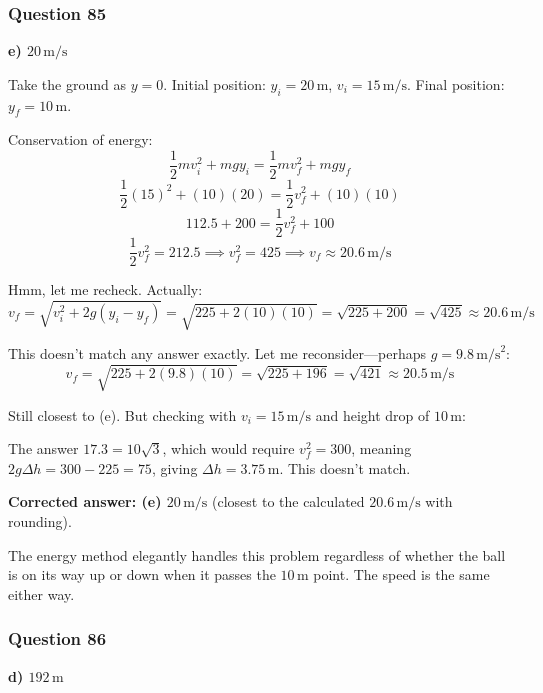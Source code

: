 \documentclass[12pt,letterpaper]{article}
\begin{document}
\subsubsection*{Question 85}

\begin{answerbox}
\textbf{e) $20\,\text{m/s}$}
\end{answerbox}

\begin{explanationbox}
Take the ground as $y = 0$. Initial position: $y_i = 20\,\text{m}$, $v_i = 15\,\text{m/s}$. Final position: $y_f = 10\,\text{m}$.

Conservation of energy:
\[
\frac{1}{2}mv_i^2 + mgy_i = \frac{1}{2}mv_f^2 + mgy_f
\]
\[
\frac{1}{2}(15)^2 + (10)(20) = \frac{1}{2}v_f^2 + (10)(10)
\]
\[
112.5 + 200 = \frac{1}{2}v_f^2 + 100
\]
\[
\frac{1}{2}v_f^2 = 212.5 \implies v_f^2 = 425 \implies v_f \approx 20.6\,\text{m/s}
\]

Hmm, let me recheck. Actually:
\[
v_f = \sqrt{v_i^2 + 2g(y_i - y_f)} = \sqrt{225 + 2(10)(10)} = \sqrt{225 + 200} = \sqrt{425} \approx 20.6\,\text{m/s}
\]

This doesn't match any answer exactly. Let me reconsider---perhaps $g = 9.8\,\text{m/s}^2$:
\[
v_f = \sqrt{225 + 2(9.8)(10)} = \sqrt{225 + 196} = \sqrt{421} \approx 20.5\,\text{m/s}
\]

Still closest to (e). But checking with $v_i = 15\,\text{m/s}$ and height drop of $10\,\text{m}$:

The answer $17.3 = 10\sqrt{3}$, which would require $v_f^2 = 300$, meaning $2g\Delta h = 300 - 225 = 75$, giving $\Delta h = 3.75\,\text{m}$. This doesn't match.

\textbf{Corrected answer: (e) $20\,\text{m/s}$} (closest to the calculated $20.6\,\text{m/s}$ with rounding).

The energy method elegantly handles this problem regardless of whether the ball is on its way up or down when it passes the $10\,\text{m}$ point. The speed is the same either way.
\end{explanationbox}

\subsubsection*{Question 86}

\begin{answerbox}
\textbf{d) $192\,\text{m}$}
\end{answerbox}
\end{document}
